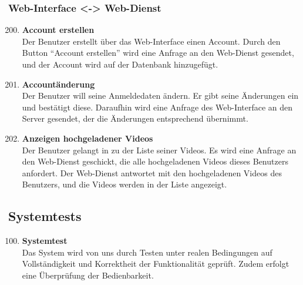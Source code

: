 \subsubsection{\gls{Web-Interface} <-> \gls{Web-Dienst}}
\begin{enumerate}[\bfseries{TI}10]  
\setcounter{enumi}{199}{}

\item \textbf{Account erstellen} \hfill\\
Der Benutzer erstellt \"uber das \gls{Web-Interface} einen Account. Durch den Button ``Account erstellen'' wird eine Anfrage an den \gls{Web-Dienst} gesendet, und der Account wird auf der Datenbank hinzugef\"ugt.

\item \textbf{Account\"anderung} \hfill\\
Der Benutzer will seine Anmeldedaten \"andern. Er gibt seine Änderungen ein und best\"atigt diese. Daraufhin wird eine Anfrage des \gls{Web-Interface} an den Server gesendet, der die Änderungen entsprechend übernimmt.

\item \textbf{Anzeigen hochgeladener Videos} \hfill\\
Der Benutzer gelangt in zu der Liste seiner Videos. Es wird  eine Anfrage an den \gls{Web-Dienst} geschickt, die alle hochgeladenen Videos dieses Benutzers anfordert. Der Web-Dienst antwortet mit den hochgeladenen Videos des Benutzers, und die Videos werden in der Liste angezeigt. 

\end{enumerate}

\subsection{Systemtests}
\begin{enumerate}[\bfseries{TS}10]  
\setcounter{enumi}{99}{}

\item \textbf{Systemtest} \hfill\\  
Das System wird von uns durch Testen unter realen Bedingungen auf Vollständigkeit und Korrektheit der Funktionalität geprüft. Zudem erfolgt eine Überprüfung der Bedienbarkeit. 
\end{enumerate}

